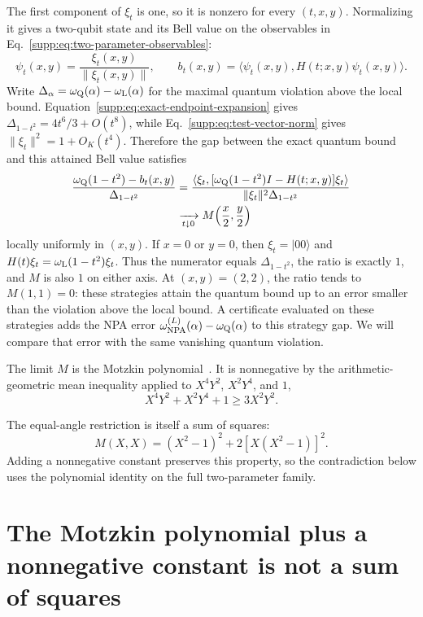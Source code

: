 \documentclass[aps,prl,onecolumn,10pt,superscriptaddress,nofootinbib,longbibliography]{revtex4-2}
\theoremstyle{remark}
\begin{document}
The first component of $\xi_t$ is one, so it is nonzero for every $(t,x,y)$. Normalizing it gives a two-qubit state and its Bell value on the observables in Eq.~\eqref{supp:eq:two-parameter-observables}:
\begin{equation}
\psi_t(x,y)=\frac{\xi_t(x,y)}{\|\xi_t(x,y)\|},
\qquad
b_t(x,y)=\langle\psi_t(x,y),H(t;x,y)\psi_t(x,y)\rangle.
\label{supp:eq:normalized-test-strategy}
\end{equation}
Write $\Delta_\alpha=\omega_{\rm Q}(\alpha)-\omega_{\rm L}(\alpha)$ for the maximal quantum violation above the local bound. Equation~\eqref{supp:eq:exact-endpoint-expansion} gives $\Delta_{1-t^2}=4t^6/3+O(t^8)$, while Eq.~\eqref{supp:eq:test-vector-norm} gives $\|\xi_t\|^2=1+O_K(t^4)$. Therefore the gap between the exact quantum bound and this attained Bell value satisfies
\begin{align}
\frac{\omega_{\rm Q}(1-t^2)-b_t(x,y)}{\Delta_{1-t^2}}
&=\frac{\langle\xi_t,[\omega_{\rm Q}(1-t^2)I-H(t;x,y)]\xi_t\rangle}
{\|\xi_t\|^2\Delta_{1-t^2}}
\nonumber\\
&\xrightarrow[t\downarrow0]{}M\!\left(\frac{x}{2},\frac{y}{2}\right)
\label{supp:eq:normalized-bell-gap}
\end{align}
locally uniformly in $(x,y)$. If $x=0$ or $y=0$, then $\xi_t=|00\rangle$ and $H(t)\xi_t=\omega_{\rm L}(1-t^2)\xi_t$. Thus the numerator equals $\Delta_{1-t^2}$, the ratio is exactly $1$, and $M$ is also $1$ on either axis. At $(x,y)=(2,2)$, the ratio tends to $M(1,1)=0$: these strategies attain the quantum bound up to an error smaller than the violation above the local bound. A certificate evaluated on these strategies adds the NPA error $\omega_{\rm NPA}^{(L)}(\alpha)-\omega_{\rm Q}(\alpha)$ to this strategy gap. We will compare that error with the same vanishing quantum violation.

The limit $M$ is the Motzkin polynomial~\cite{Motzkin1967}. It is nonnegative by the arithmetic-geometric mean inequality applied to $X^4Y^2$, $X^2Y^4$, and $1$,
\begin{equation}
X^4Y^2+X^2Y^4+1\geq3X^2Y^2.
\label{supp:eq:motzkin-nonnegative}
\end{equation}

The equal-angle restriction is itself a sum of squares:
\[
M(X,X)=(X^2-1)^2+2[X(X^2-1)]^2.
\]
Adding a nonnegative constant preserves this property, so the contradiction below uses the polynomial identity on the full two-parameter family.

\section{The Motzkin polynomial plus a nonnegative constant is not a sum of squares}
\label{supp:sec:not-sos}
\end{document}
